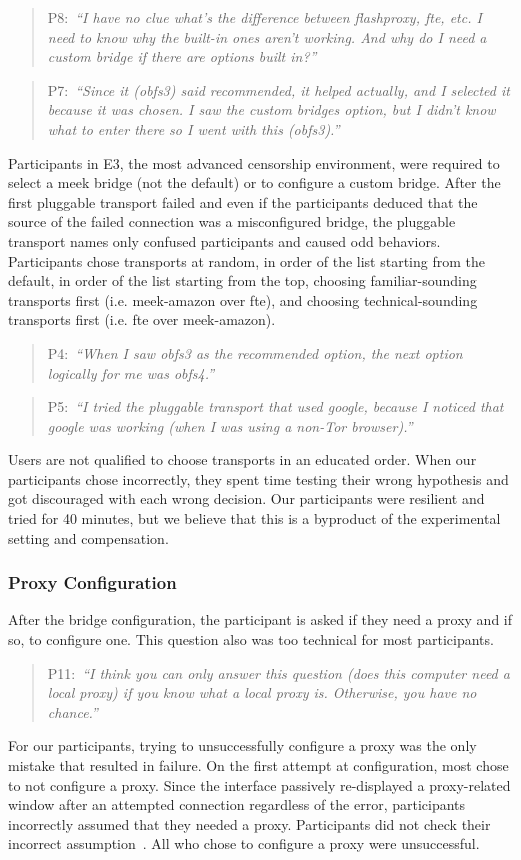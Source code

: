 \documentclass[USenglish,oneside,twocolumn]{article}
\newcommand{\pquote}[2]{
\begin{quotation}
\noindent #1:~\textit{``#2''}
\end{quotation}
}
\begin{document}
\pquote{P8}{I have no clue what's the difference between flashproxy, fte, etc. I need to know why the built-in ones aren't working. And why do I need a custom bridge if there are options built in?}
\pquote{P7}{Since it (obfs3) said recommended, it helped actually, and I selected it because it was chosen. I saw the custom bridges option, but I didn't know what to enter there so I went with this (obfs3).}

Participants in E3, the most advanced censorship environment, were required to select a meek bridge (not the default) or to configure a custom bridge. After the first pluggable transport failed and even if the participants deduced that the source of the failed connection was a misconfigured bridge, the pluggable transport names only confused participants and caused odd behaviors. Participants chose transports at random, in order of the list starting from the default, in order of the list starting from the top, choosing familiar-sounding transports first (i.e. meek-amazon over fte), and choosing technical-sounding transports first (i.e. fte over meek-amazon). 

\pquote{P4}{When I saw obfs3 as the recommended option, the next option logically for me was obfs4.}
\pquote{P5}{I tried the pluggable transport that used google, because I noticed that google was working (when I was using a non-Tor browser).}

Users are not qualified to choose transports in an educated order. When our participants chose incorrectly, they spent time testing their wrong hypothesis and got discouraged with each wrong decision. Our participants were resilient and tried for 40 minutes, but we believe that this is a byproduct of the experimental setting and compensation.

\subsubsection{Proxy Configuration} 
After the bridge configuration, the participant is asked if they need a proxy and if so, to configure one. This question also was too technical for most participants.

\pquote{P11}{I think you can only answer this question (does this computer need a local proxy) if you know what a local proxy is. Otherwise, you have no chance.}

For our participants, trying to unsuccessfully configure a proxy was the only mistake that resulted in failure. On the first attempt at configuration, most chose to not configure a proxy. Since the interface passively re-displayed a proxy-related window after an attempted connection regardless of the error, participants incorrectly assumed that they needed a proxy. Participants did not check their incorrect assumption~\cite{wason1960failure}. All who chose to configure a proxy were unsuccessful. 
\end{document}
